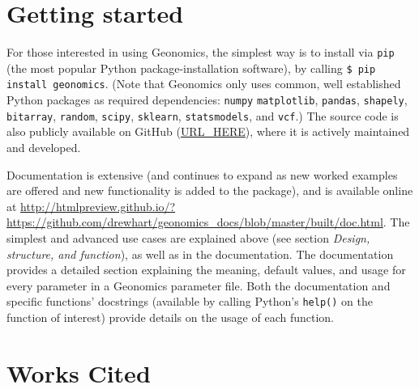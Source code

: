 ﻿\documentclass{article}
\begin{document}
\section{Getting started}
For those interested in using Geonomics, the simplest way is to install
via \texttt{pip} (the most popular Python package-installation software),
by calling \texttt{\$ pip install geonomics}.
(Note that Geonomics only uses common, well established Python packages
as required dependencies: \texttt{numpy} \texttt{matplotlib},
\texttt{pandas}, \texttt{shapely}, \texttt{bitarray}, \texttt{random},
\texttt{scipy}, \texttt{sklearn}, \texttt{statsmodels}, and \texttt{vcf}.)
The source code is also publicly available on GitHub (\url{URL_HERE}),
where it is actively maintained and developed.

Documentation is extensive (and continues to expand as new worked examples
are offered and new functionality is added to the package), and is available
online at \url{http://htmlpreview.github.io/?https://github.com/drewhart/geonomics\_docs/blob/master/built/doc.html}.  
The simplest and advanced use cases are explained above (see section
\emph{Design, structure, and function}), as well as in the documentation.
The documentation provides a detailed section explaining the meaning,
default values, and usage for every parameter in a Geonomics parameter
file.
Both the documentation and specific functions' docstrings (available
by calling Python's \texttt{help()} on the function of interest) provide
details on the usage of each function.

\section{Works Cited}
\end{document}
